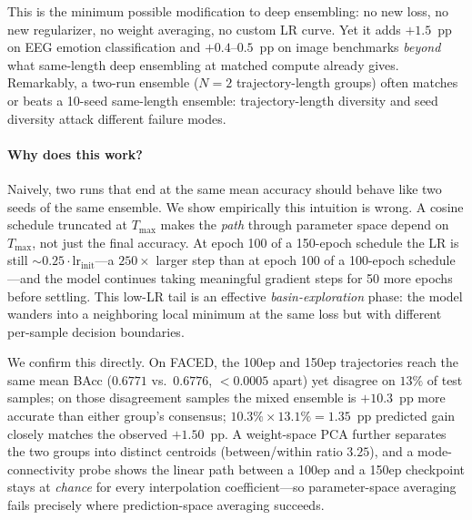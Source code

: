 This is the minimum possible modification to deep ensembling: no new loss,
no new regularizer, no weight averaging, no custom LR curve. Yet it adds
$+1.5$~pp on EEG emotion classification and $+0.4$--$0.5$~pp on image
benchmarks \emph{beyond} what same-length deep ensembling at matched
compute already gives. Remarkably, a two-run \ours{} ensemble ($N{=}2$
trajectory-length groups) often matches or beats a 10-seed same-length
ensemble: trajectory-length diversity and seed diversity attack different
failure modes.

\paragraph{Why does this work?}
Naively, two runs that end at the same mean accuracy should behave like
two seeds of the same ensemble. We show empirically this intuition is
wrong. A cosine schedule truncated at $T_\mathrm{max}$ makes the
\emph{path} through parameter space depend on $T_\mathrm{max}$, not just
the final accuracy. At epoch 100 of a 150-epoch schedule the LR is still
$\sim\!0.25\cdot \mathrm{lr}_{\mathrm{init}}$---a $250\times$ larger step
than at epoch 100 of a 100-epoch schedule---and the model continues taking
meaningful gradient steps for 50 more epochs before settling. This
low-LR tail is an effective \emph{basin-exploration} phase: the model
wanders into a neighboring local minimum at the same loss but with
different per-sample decision boundaries.

We confirm this directly. On FACED, the 100ep and 150ep trajectories reach
the same mean BAcc ($0.6771$ vs.\ $0.6776$, $<\!0.0005$ apart) yet disagree
on $13\%$ of test samples; on those disagreement samples the mixed
ensemble is $+10.3$~pp more accurate than either group's consensus;
$10.3\% \times 13.1\% = 1.35$~pp predicted gain closely matches the
observed $+1.50$~pp. A weight-space PCA further separates the two groups
into distinct centroids (between/within ratio $3.25$), and a
mode-connectivity probe shows the linear path between a 100ep and a 150ep
checkpoint stays at \emph{chance} for every interpolation coefficient---so
parameter-space averaging fails precisely where prediction-space averaging
succeeds.

